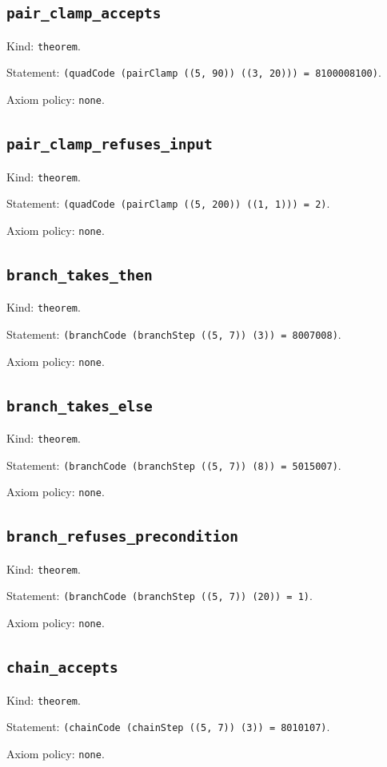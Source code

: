 \documentclass[11pt]{article}
\begin{document}
\subsection*{\texttt{pair\_clamp\_accepts}}
\noindent Kind: \texttt{theorem}.\par
\noindent Statement: \texttt{(quadCode (pairClamp ((5, 90)) ((3, 20))) = 8100008100)}.\par
\noindent Axiom policy: \texttt{none}.\par
\subsection*{\texttt{pair\_clamp\_refuses\_input}}
\noindent Kind: \texttt{theorem}.\par
\noindent Statement: \texttt{(quadCode (pairClamp ((5, 200)) ((1, 1))) = 2)}.\par
\noindent Axiom policy: \texttt{none}.\par
\subsection*{\texttt{branch\_takes\_then}}
\noindent Kind: \texttt{theorem}.\par
\noindent Statement: \texttt{(branchCode (branchStep ((5, 7)) (3)) = 8007008)}.\par
\noindent Axiom policy: \texttt{none}.\par
\subsection*{\texttt{branch\_takes\_else}}
\noindent Kind: \texttt{theorem}.\par
\noindent Statement: \texttt{(branchCode (branchStep ((5, 7)) (8)) = 5015007)}.\par
\noindent Axiom policy: \texttt{none}.\par
\subsection*{\texttt{branch\_refuses\_precondition}}
\noindent Kind: \texttt{theorem}.\par
\noindent Statement: \texttt{(branchCode (branchStep ((5, 7)) (20)) = 1)}.\par
\noindent Axiom policy: \texttt{none}.\par
\subsection*{\texttt{chain\_accepts}}
\noindent Kind: \texttt{theorem}.\par
\noindent Statement: \texttt{(chainCode (chainStep ((5, 7)) (3)) = 8010107)}.\par
\noindent Axiom policy: \texttt{none}.\par
\end{document}
